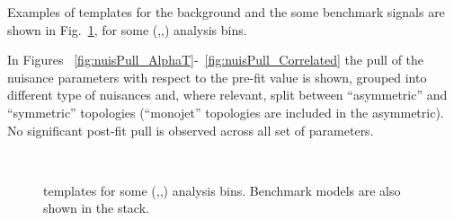 Examples of \mht templates for the background and the some benchmark signals are shown in Fig.~\ref{fig:mht-templates}, 
for some (\njet,\nb,\scalht) analysis bins. 

In Figures ~\ref{fig:nuisPull_AlphaT}-~\ref{fig:nuisPull_Correlated} the pull 
of the nuisance parameters with respect to the pre-fit value is shown, 
grouped into different type of nuisances and, where relevant, 
split between ``asymmetric'' and ``symmetric'' topologies 
(``monojet'' topologies are included in the asymmetric). \\
No significant post-fit pull is observed across all set of parameters. 

\clearpage
\begin{figure}[tbhp]
    \caption{ \mht templates for some (\njet,\nb,\scalht) analysis bins. Benchmark models are also shown in the stack. \label{fig:mht-templates} }
  \begin{center}
     ~~
     \\

\end{center}
\end{figure}
